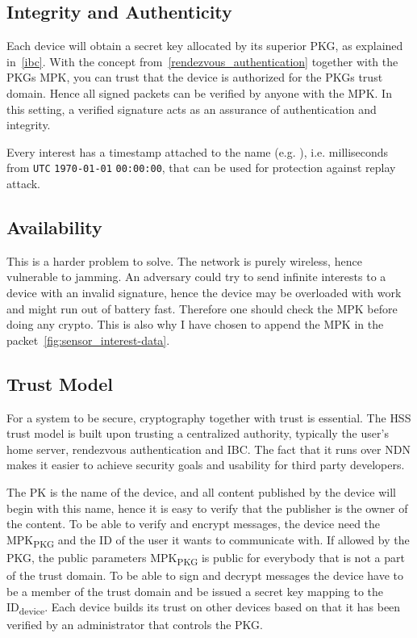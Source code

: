 \subsection{Integrity and Authenticity}
Each device will obtain a secret key allocated by its superior \gls{PKG}, as explained in~\autoref{ibc}.
With the concept from~\autoref{rendezvous_authentication} together with the \gls{PKG}s \gls{MPK}, you can trust that the device is authorized for the \gls{PKG}s trust domain. 
Hence all signed packets can be verified by anyone with the \gls{MPK}.
In this setting, a verified signature acts as an assurance of authentication and integrity. 

Every \gls{interest} has a timestamp attached to the \gls{name} (e.g. ), i.e. milliseconds from \texttt{UTC} \texttt{1970-01-01} \texttt{00:00:00}, that can be used for protection against replay attack. 

\subsection{Availability}
This is a harder problem to solve.
The network is purely wireless, hence vulnerable to jamming. 
An adversary could try to send infinite \gls{interest}s to a device with an invalid signature, hence the device may be overloaded with work and might run out of battery fast.
Therefore one should check the \gls{MPK} before doing any crypto.
This is also why I have chosen to append the MPK in the packet~\autoref{fig:sensor_interest-data}. 

\subsection{Trust Model}
For a system to be secure, cryptography together with trust is essential. 
The \gls{HSS} trust model is built upon trusting a centralized authority, typically the user's home server, rendezvous authentication and \gls{IBC}.
The fact that it runs over \gls{NDN} makes it easier to achieve security goals and usability for third party developers.

The \gls{PK} is the \gls{name} of the device, and all content published by the device will begin with this \gls{name}, hence it is easy to verify that the \gls{publisher} is the owner of the content.
To be able to verify and encrypt messages, the device need the MPK\textsubscript{PKG} and the ID of the user it wants to communicate with. 
If allowed by the PKG, the public parameters MPK\textsubscript{PKG} is public for everybody that is not a part of the trust domain. 
To be able to sign and decrypt messages the device have to be a member of the trust domain and be issued a secret key mapping to the ID\textsubscript{device}.
Each device builds its trust on other devices based on that it has been verified by an administrator that controls the \gls{PKG}.
